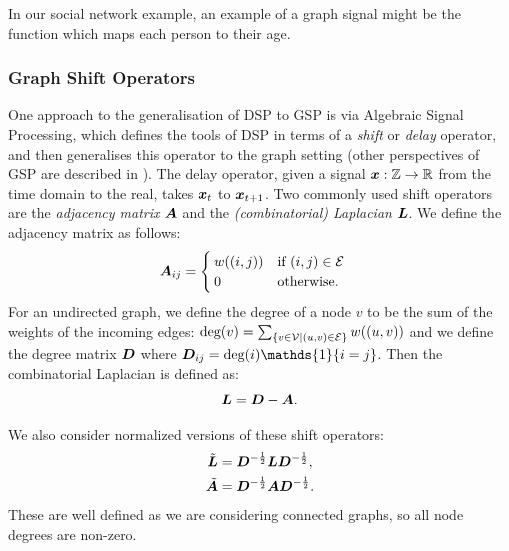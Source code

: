 In our social network example, an example of a graph signal might be the function which maps each person to their age.

\subsubsection{Graph Shift Operators}
One approach to the generalisation of DSP to GSP is via Algebraic Signal Processing, which defines the tools of DSP in terms of a \emph{shift} or \emph{delay} operator, and then generalises this operator to the graph setting (other perspectives of GSP are described in \cite{ortega2018graph}). The delay operator, given a signal $\bm{x}: \mathbb{Z} \to \mathbb{R}$ from the time domain to the real, takes $\bm{x}_{t}$ to $\bm{x}_{t+1}$. Two commonly used shift operators are the \emph{adjacency matrix} $\bm{A}$ and the \emph{(combinatorial) Laplacian} $\bm{L}$. We define the adjacency matrix as follows:
\begin{align}
    \bm{A}_{ij} &= \begin{cases}
        w((i,j)) &\text{if } (i,j) \in \mathcal{E} \\
        0 &\text{otherwise.}
    \end{cases}
\end{align}
For an undirected graph, we define the degree of a node $v$ to be the sum of the weights of the incoming edges: $\text{deg}(v) = \sum_{\{v \in \mathcal{V} \mid (u,v) \in \mathcal{E}\}} w((u,v))$ and we define the degree matrix $\bm{D}$ where $\matr{D}_{ij} = \text{deg}(i) \mathds{1}\{i = j \}$.
Then the combinatorial Laplacian is defined as:
\begin{equation}
    \bm{L} = \bm{D} - \bm{A}.
\end{equation}


\noindent We also consider normalized versions of these shift operators:
\begin{align}
    \tilde{\bm{L}} &= \bm{D}^{-\frac{1}{2}}\bm{L}\bm{D}^{-\frac{1}{2}}, \\
    \tilde{\bm{A}} &= \bm{D}^{-\frac{1}{2}}\bm{A}\bm{D}^{-\frac{1}{2}}.
\end{align}
These are well defined as we are considering connected graphs, so all node degrees are non-zero.

